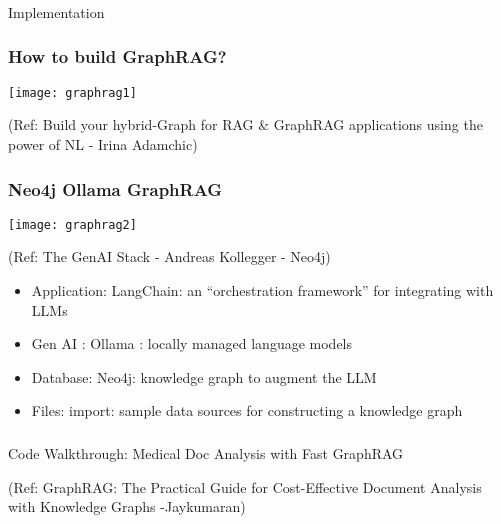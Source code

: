 \begin{frame}[fragile]\frametitle{}
\begin{center}
{\Large Implementation}
\end{center}
\end{frame}


\begin{frame}[fragile]\frametitle{How to build GraphRAG?}

	\begin{center}
	\texttt{[image: graphrag1]}
	
	{\tiny (Ref: Build your hybrid-Graph for RAG \& GraphRAG applications using the power of NL - Irina Adamchic)}
	\end{center}
	
\end{frame}


\begin{frame}[fragile]\frametitle{Neo4j Ollama GraphRAG}

	\begin{center}
	\texttt{[image: graphrag2]}
	
	{\tiny (Ref: The GenAI Stack - Andreas Kollegger - Neo4j)}
	\end{center}
	
	    \begin{itemize}
        \item Application: LangChain: an ``orchestration framework'' for integrating with LLMs
		\item Gen AI : Ollama : locally managed language models
		\item Database: Neo4j: knowledge graph to augment the LLM
		\item Files: import: sample data sources for constructing a knowledge graph
    \end{itemize}
\end{frame}

\begin{frame}[fragile]\frametitle{}
\begin{center}
{\Large Code Walkthrough: Medical Doc Analysis with Fast GraphRAG}

	{\tiny (Ref: GraphRAG: The Practical Guide for Cost-Effective Document Analysis with Knowledge Graphs -Jaykumaran)}
	
\end{center}
\end{frame}


